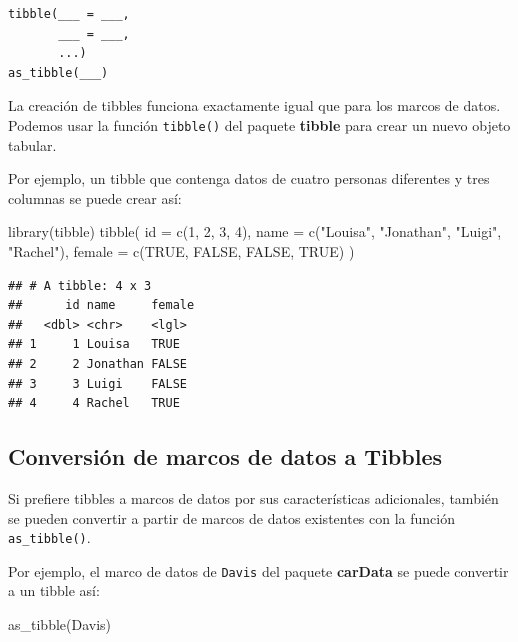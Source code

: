 \documentclass[
]{book}
\newenvironment{Shaded}{\begin{snugshade}}{\end{snugshade}}
\newcommand{\AttributeTok}[1]{\textcolor[rgb]{0.77,0.63,0.00}{#1}}
\newcommand{\ConstantTok}[1]{\textcolor[rgb]{0.00,0.00,0.00}{#1}}
\newcommand{\DecValTok}[1]{\textcolor[rgb]{0.00,0.00,0.81}{#1}}
\newcommand{\FunctionTok}[1]{\textcolor[rgb]{0.00,0.00,0.00}{#1}}
\newcommand{\NormalTok}[1]{#1}
\newcommand{\StringTok}[1]{\textcolor[rgb]{0.31,0.60,0.02}{#1}}
\begin{document}
\begin{verbatim}
tibble(___ = ___, 
       ___ = ___, 
       ...)
as_tibble(___)
\end{verbatim}

La creación de tibbles funciona exactamente igual que para los marcos de datos. Podemos usar la función \texttt{tibble()} del paquete \textbf{tibble} para crear un nuevo objeto tabular.

Por ejemplo, un tibble que contenga datos de cuatro personas diferentes y tres columnas se puede crear así:

\begin{Shaded}
\begin{Highlighting}[]
\FunctionTok{library}\NormalTok{(tibble)}
\FunctionTok{tibble}\NormalTok{(}
  \AttributeTok{id =} \FunctionTok{c}\NormalTok{(}\DecValTok{1}\NormalTok{, }\DecValTok{2}\NormalTok{, }\DecValTok{3}\NormalTok{, }\DecValTok{4}\NormalTok{),}
  \AttributeTok{name =} \FunctionTok{c}\NormalTok{(}\StringTok{"Louisa"}\NormalTok{, }\StringTok{"Jonathan"}\NormalTok{, }\StringTok{"Luigi"}\NormalTok{, }\StringTok{"Rachel"}\NormalTok{),}
  \AttributeTok{female =} \FunctionTok{c}\NormalTok{(}\ConstantTok{TRUE}\NormalTok{, }\ConstantTok{FALSE}\NormalTok{, }\ConstantTok{FALSE}\NormalTok{, }\ConstantTok{TRUE}\NormalTok{)}
\NormalTok{)}
\end{Highlighting}
\end{Shaded}

\begin{verbatim}
## # A tibble: 4 x 3
##      id name     female
##   <dbl> <chr>    <lgl> 
## 1     1 Louisa   TRUE  
## 2     2 Jonathan FALSE 
## 3     3 Luigi    FALSE 
## 4     4 Rachel   TRUE
\end{verbatim}

\hypertarget{conversiuxf3n-de-marcos-de-datos-a-tibbles}{%
\subsection{Conversión de marcos de datos a Tibbles}\label{conversiuxf3n-de-marcos-de-datos-a-tibbles}}

Si prefiere tibbles a marcos de datos por sus características adicionales, también se pueden convertir a partir de marcos de datos existentes con la función \texttt{as\_tibble()}.

Por ejemplo, el marco de datos de \texttt{Davis} del paquete \textbf{carData} se puede convertir a un tibble así:

\begin{Shaded}
\begin{Highlighting}[]
\FunctionTok{as\_tibble}\NormalTok{(Davis)}
\end{Highlighting}
\end{Shaded}
\end{document}
